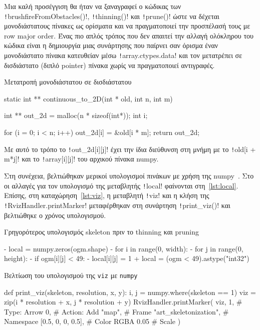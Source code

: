 \sloppy Μια καλή προσέγγιση θα ήταν να ξαναγραφεί ο κώδικας των
\texttt!brushfireFromObstacles()!,
\texttt!thinning()! και
\texttt!prune()!
ώστε να δέχεται μονοδιάστατους πίνακες ως ορίσματα και να πραγματοποιεί την προσπέλασή τους με row major order.
Ένας πιο απλός τρόπος που δεν απαιτεί την αλλαγή ολόκληρου του κώδικα είναι η δημιουργία μιας συνάρτησης που παίρνει σαν όρισμα έναν μονοδιάστατο πίνακα κατευθείαν μέσω \texttt!array.ctypes.data!
και τον μετατρέπει σε δισδιάστατο (διπλό pointer) πίνακα χωρίς να πραγματοποιεί αντιγραφές.
\begin{code}
\caption{Μετατροπή μονοδιάστατου σε δισδιάστατου}
\begin{Ccode}
static int ** continuous_to_2D(int * old, int n, int m){
    int ** out_2d = malloc(n * sizeof(int*));
    int i;

    for (i = 0; i < n; i++){
        out_2d[i] = &old[i * m];
    }
    return out_2d;
}
\end{Ccode}
\end{code}
Με αυτό το τρόπο το \texttt!out_2d[i][j]! έχει την ίδια διεύθυνση στη μνήμη με το \texttt!old[i + m*j]! και το \texttt!array[i][j]! του αρχικού πίνακα numpy.

Στη συνέχεια, βελτιώθηκαν μερικοί υπολογισμοί πινάκων με χρήση της numpy~\cite{numpy}.
Στο  οι αλλαγές για τον υπολογισμό της μεταβλητής \texttt!local! φαίνονται στη~\ref{lst:local}.
Επίσης, στη καταχώρηση~\ref{lst:viz},
η μεταβλητή \texttt!viz! και η κλήση της \texttt!RvizHandler.printMarker! μεταφέρθηκαν στη συνάρτηση \texttt!print_viz()! %
και βελτιώθηκε ο χρόνος υπολογισμού.

\begin{code}
\caption{Γρηγορότερος υπολογισμός skeleton πριν το thinning και pruning}\label{lst:local}
\begin{pythoncode}
-    local = numpy.zeros(ogm.shape)
-    for i in range(0, width):
-        for j in range(0, height):
-            if ogm[i][j] < 49:
-                local[i][j] = 1
+    local = (ogm < 49).astype("int32")
\end{pythoncode}
\end{code}

\begin{code}
\caption{Βελτίωση του υπολογισμού της \texttt{viz} με \texttt{numpy}}\label{lst:viz}
\begin{pythoncode}
def print_viz(skeleton, resolution, x, y):
    i, j = numpy.where(skeleton == 1)
    viz = zip(i * resolution + x, j * resolution + y)
    RvizHandler.printMarker(
        viz,
        1,  # Type: Arrow
        0,  # Action: Add
        "map",  # Frame
        "art_skeletonization",  # Namespace
        [0.5, 0, 0, 0.5],  # Color RGBA
        0.05  # Scale
    )
\end{pythoncode}
\end{code}
